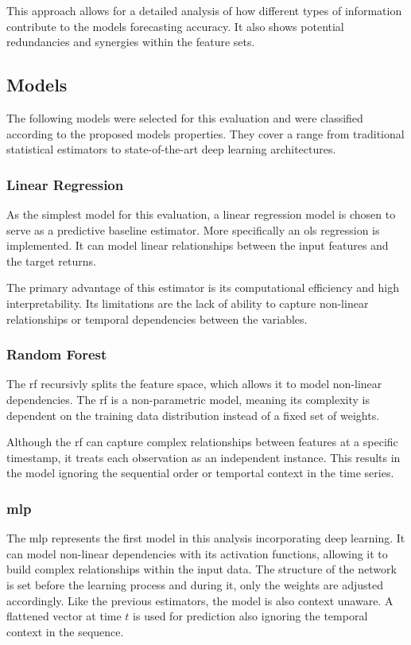 \documentclass[12pt,twoside=false,a4paper,parskip]{scrbook}
\begin{document}
This approach allows for a detailed analysis of how different types of information contribute to the models forecasting accuracy. It also shows potential redundancies and synergies within the feature sets. 




\subsection{Models}

The following models were selected for this evaluation and were classified according to the proposed models properties. They cover a range from traditional statistical estimators to state-of-the-art deep learning architectures.

\subsubsection{Linear Regression}
As the simplest model for this evaluation, a linear regression model is chosen to serve as a predictive baseline estimator. More specifically an \gls{ols} regression is implemented. It can model linear relationships between the input features and the target returns.

The primary advantage of this estimator is its computational efficiency and high interpretability. Its limitations are the lack of ability to capture non-linear relationships or temporal dependencies between the variables.



\subsubsection{Random Forest}
The \gls{rf} recursivly splits the feature space, which allows it to model non-linear dependencies. The \gls{rf} is a non-parametric model, meaning its complexity is dependent on the training data distribution instead of a fixed set of weights. 

Although the \gls{rf} can capture complex relationships between features at a specific timestamp, it treats each observation as an independent instance. This results in the model ignoring the sequential order or temportal context in the time series.
    

\subsubsection{\gls{mlp}}
The \gls{mlp} represents the first model in this analysis incorporating deep learning. It can model non-linear dependencies with its activation functions, allowing it to build complex relationships within the input data. The structure of the network is set before the learning process and during it, only the weights are adjusted accordingly. 
Like the previous estimators, the model is also context unaware. A flattened vector at time $t$ is used for prediction also ignoring the temporal context in the sequence. 
\end{document}

